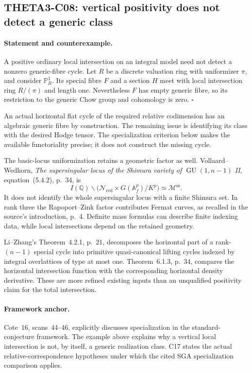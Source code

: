 \documentclass[11pt]{article}
\newcommand{\Q}{\mathbb Q}\newcommand{\C}{\mathbb C}\newcommand{\Z}{\mathbb Z}\newcommand{\R}{\mathbb R}\newcommand{\A}{\mathbb A}\newcommand{\OO}{\mathcal O}
\theoremstyle{definition}\newtheorem{definition}[theorem]{Definition}\newtheorem{remark}[theorem]{Remark}
\begin{document}
\subsection{THETA3-C08: vertical positivity does not detect a generic class}\label{C08}

\paragraph{Statement and counterexample.}
A positive ordinary local intersection on an integral model need
not detect a nonzero generic-fibre cycle. Let $R$ be a discrete
valuation ring with uniformizer $\pi$, and consider $\mathbb P^1_R$.
Its special fibre $F$ and a section $H$ meet with local intersection
ring $R/(\pi)$ and length one. Nevertheless $F$ has empty generic
fibre, so its restriction to the generic Chow group and cohomology
is zero. $\square$

An actual horizontal flat cycle of the required relative
codimension has an algebraic generic fibre by construction. The
remaining issue is identifying its class with the desired Hodge
tensor. The specialization criterion below makes the available
functoriality precise; it does not construct the missing cycle.

The basic-locus uniformization retains a geometric factor as well.
Vollaard--Wedhorn, \emph{The supersingular locus of the Shimura
variety of $\operatorname{GU}(1,n-1)$ II}, equation~(5.4.2), p.~34,
is
\[
 I(\Q)\backslash
 \bigl(\mathcal N_{\mathrm{red}}\times G(\mathbb A_f^p)/K^p\bigr)
 \simeq \mathcal M^{\mathrm{ss}}.
\]
It does not identify the whole supersingular locus with a finite
Shimura set. In rank three the Rapoport--Zink factor contributes
Fermat curves, as recalled in the source's introduction, p.~4.
Definite mass formulas can describe finite indexing data, while
local intersections depend on the retained geometry.

Li--Zhang's Theorem~4.2.1, p.~21, decomposes the horizontal part of
a rank-$(n-1)$ special cycle into primitive quasi-canonical lifting
cycles indexed by integral overlattices of type at most one.
Theorem~6.1.3, p.~34, compares the horizontal intersection function
with the corresponding horizontal density derivative. These are
more refined existing inputs than an unqualified positivity claim
for the total intersection.

\paragraph{Framework anchor.}
Cote~16, scans~44--46, explicitly discusses specialization in the
standard-conjecture framework.  The example above explains why a
vertical local intersection is not, by itself, a generic realization
class.  C17 states the actual relative-correspondence hypotheses under
which the cited SGA specialization comparison applies.
\end{document}
